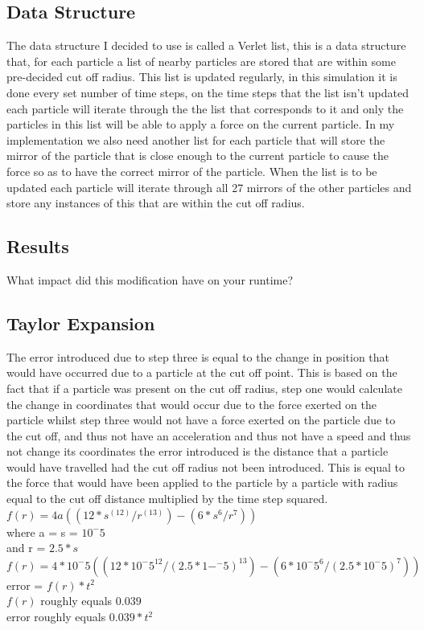 \documentclass[paper=a4, fontsize=11pt]{scrartcl}
\numberwithin{equation}{section}		%
\numberwithin{figure}{section}			%
\numberwithin{table}{section}				%
\begin{document}
\subsection{Data Structure}

The data structure I decided to use is called a Verlet list, this is a data structure that, for each particle a list of nearby particles are stored that are within some pre-decided cut off radius. This list is updated regularly, in this simulation it is done every set number of time steps, on the time steps that the list isn't updated each particle will iterate through the the list that corresponds to it and only the particles in this list will be able to apply a force on the current particle. In my implementation we also need another list for each particle that will store the mirror of the particle that is close enough to the current particle to cause the force so as to have the correct mirror of the particle. When the list is to be updated each particle will iterate through all 27 mirrors of the other particles and store any instances of this that are within the cut off radius. 

\subsection{Results}

What impact did this modification have on your runtime?\\

\subsection{Taylor Expansion}

The error introduced due to step three is equal to the change in position that would have occurred due to a particle at the cut off point. This is based on the fact that if a particle was present on the cut off radius, step one would calculate the change in coordinates that would occur due to the force exerted on the particle whilst step three would not have a force exerted on the particle due to the cut off, and thus not have an acceleration and thus not have a speed and thus not change its coordinates the error introduced is the distance that a particle would have travelled had the cut off radius not been introduced. This is equal to the force that would have been applied to the particle by a particle with radius equal to the cut off distance multiplied by the time step squared.\\
\center
$f(r) = 4a((12 * s^(12) / r^(13)) - (6 * s^6 / r^7))$\\
where a = s = $10^-5$\\
and r = $2.5 * s$\\
$f(r) = 4 * 10^-5((12 * 10^-5^12/(2.5 * 1-^-5)^13) - (6 * 10^-5^6 / (2.5 * 10^-5)^7))$\\
error = $f(r) * t^2$\\
$f(r)$ roughly equals $0.039$\\
error roughly equals $0.039 * t^2$\\


\end{document}
